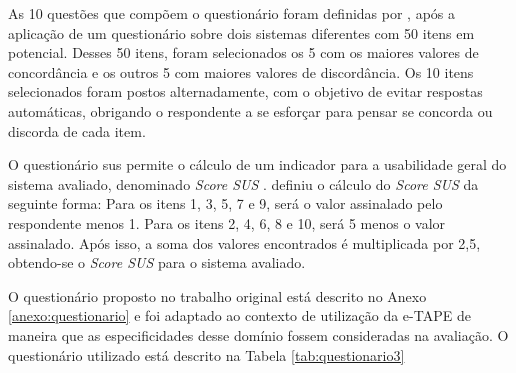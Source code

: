 \par
As 10 questões que compõem o questionário foram definidas por , após a aplicação de um questionário sobre dois sistemas diferentes com 50 itens em potencial. Desses 50 itens, foram selecionados os 5 com os maiores valores de concordância e os outros 5 com maiores valores de discordância. Os 10 itens selecionados
foram postos alternadamente, com o objetivo de evitar respostas automáticas, obrigando o respondente a se esforçar para pensar se concorda ou discorda de cada item. 

\par
O questionário \acrshort{sus} permite o cálculo de um indicador para a usabilidade geral do sistema avaliado, denominado \textit{Score SUS} . 
 definiu o cálculo do \textit{Score SUS} da seguinte forma:
Para os itens 1, 3, 5, 7 e 9, será o valor assinalado pelo respondente menos 1. Para os itens 2, 4, 6, 8 e 10, será 5 menos o valor assinalado. Após isso, a soma dos valores 
encontrados é multiplicada por 2,5, obtendo-se o \textit{Score SUS} para o sistema avaliado.

\par
O questionário proposto no trabalho original está descrito no Anexo \ref{anexo:questionario} e  foi adaptado ao contexto de utilização da e-TAPE de maneira que as especificidades desse domínio fossem consideradas na avaliação. O questionário utilizado está descrito na Tabela \ref{tab:questionario3}

